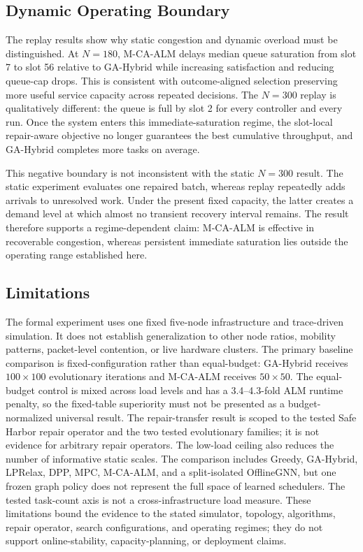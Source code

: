 \subsection{Dynamic Operating Boundary}
The replay results show why static congestion and dynamic overload must be distinguished. At $N=180$, M-CA-ALM delays median queue saturation from slot 7 to slot 56 relative to GA-Hybrid while increasing satisfaction and reducing queue-cap drops. This is consistent with outcome-aligned selection preserving more useful service capacity across repeated decisions. The $N=300$ replay is qualitatively different: the queue is full by slot 2 for every controller and every run. Once the system enters this immediate-saturation regime, the slot-local repair-aware objective no longer guarantees the best cumulative throughput, and GA-Hybrid completes more tasks on average.

This negative boundary is not inconsistent with the static $N=300$ result. The static experiment evaluates one repaired batch, whereas replay repeatedly adds arrivals to unresolved work. Under the present fixed capacity, the latter creates a demand level at which almost no transient recovery interval remains. The result therefore supports a regime-dependent claim: M-CA-ALM is effective in recoverable congestion, whereas persistent immediate saturation lies outside the operating range established here.

\subsection{Limitations}
The formal experiment uses one fixed five-node infrastructure and trace-driven simulation. It does not establish generalization to other node ratios, mobility patterns, packet-level contention, or live hardware clusters. The primary baseline comparison is fixed-configuration rather than equal-budget: GA-Hybrid receives $100\times100$ evolutionary iterations and M-CA-ALM receives $50\times50$. The equal-budget control is mixed across load levels and has a 3.4--4.3-fold ALM runtime penalty, so the fixed-table superiority must not be presented as a budget-normalized universal result. The repair-transfer result is scoped to the tested Safe Harbor repair operator and the two tested evolutionary families; it is not evidence for arbitrary repair operators. The low-load ceiling also reduces the number of informative static scales. The comparison includes Greedy, GA-Hybrid, LPRelax, DPP, MPC, M-CA-ALM, and a split-isolated OfflineGNN, but one frozen graph policy does not represent the full space of learned schedulers. The tested task-count axis is not a cross-infrastructure load measure. These limitations bound the evidence to the stated simulator, topology, algorithms, repair operator, search configurations, and operating regimes; they do not support online-stability, capacity-planning, or deployment claims.
